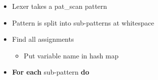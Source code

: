 \documentclass[12pt]{article}
\begin{document}
\begin{itemize}
	\item Lexer takes a pat\_scan pattern
	\item Pattern is split into sub-patterns at whitespace
	\item Find all assignments
	\begin{itemize}
		\item Put variable name in hash map
	\end{itemize}
	\item \textbf{For each} sub-pattern \textbf{do}
\end{itemize}



\newpage



\end{document}
